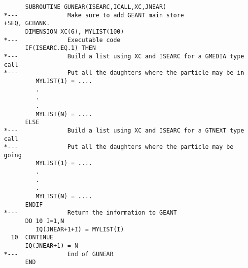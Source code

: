 \begin{verbatim}
      SUBROUTINE GUNEAR(ISEARC,ICALL,XC,JNEAR)
*---              Make sure to add GEANT main store
+SEQ, GCBANK.
      DIMENSION XC(6), MYLIST(100)
*---              Executable code
      IF(ISEARC.EQ.1) THEN
*---              Build a list using XC and ISEARC for a GMEDIA type call
*---              Put all the daughters where the particle may be in
         MYLIST(1) = ....
         .
         .
         .
         MYLIST(N) = ....
      ELSE 
*---              Build a list using XC and ISEARC for a GTNEXT type call
*---              Put all the daughters where the particle may be going
         MYLIST(1) = ....
         .
         .
         .
         MYLIST(N) = ....
      ENDIF
*---              Return the information to GEANT
      DO 10 I=1,N
         IQ(JNEAR+1+I) = MYLIST(I)
  10  CONTINUE
      IQ(JNEAR+1) = N
*---              End of GUNEAR
      END
\end{verbatim}

